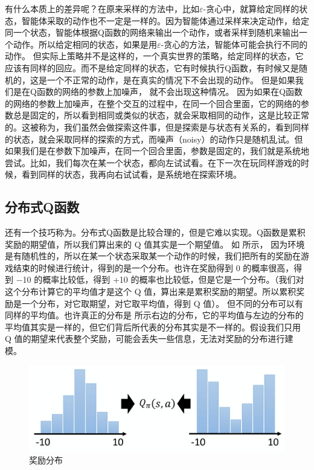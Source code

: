 有什么本质上的差异呢？在原来采样的方法中，比如$\varepsilon$-贪心中，就算给定同样的状态，智能体采取的动作也不一定是一样的。因为智能体通过采样来决定动作，给定同一个状态，智能体根据Q函数的网络来输出一个动作，或者采样到随机来输出一个动作。所以给定相同的状态，如果是用$\varepsilon$-贪心的方法，智能体可能会执行不同的动作。
但实际上策略并不是这样的，一个真实世界的策略，给定同样的状态，它应该有同样的回应。而不是给定同样的状态，它有时候执行Q函数，有时候又是随机的，这是一个不正常的动作，是在真实的情况下不会出现的动作。
但是如果我们是在Q函数的网络的参数上加噪声， 就不会出现这种情况。
因为如果在Q函数的网络的参数上加噪声，在整个交互的过程中，在同一个回合里面，它的网络的参数总是固定的，所以看到相同或类似的状态，就会采取相同的动作，这是比较正常的。这被称为，我们虽然会做探索这件事，但是探索是与状态有关系的，看到同样的状态，就会采取同样的探索的方式，而噪声（noisy）的动作只是随机乱试。但如果我们是在参数下加噪声，在同一个回合里面，参数是固定的，我们就是系统地尝试。比如，我们每次在某一个状态，都向左试试看。在下一次在玩同样游戏的时候，看到同样的状态，我再向右试试看，是系统地在探索环境。

\subsection{分布式Q函数} 
还有一个技巧称为。分布式Q函数是比较合理的，但是它难以实现。Q函数是累积奖励的期望值，所以我们算出来的 Q 值其实是一个期望值。
如 所示，
因为环境是有随机性的，所以在某一个状态采取某一个动作的时候，我们把所有的奖励在游戏结束的时候进行统计，得到的是一个分布。也许在奖励得到 0 的概率很高，得到 $-$10 的概率比较低，得到 +10 的概率也比较低，但是它是一个分布。（我们对这个分布计算它的平均值才是这个 Q 值，算出来是累积奖励的期望。所以累积奖励是一个分布，对它取期望，对它取平均值，得到 Q 值）。
但不同的分布可以有同样的平均值。也许真正的分布是 所示右边的分布，它的平均值与左边的分布的平均值其实是一样的，但它们背后所代表的分布其实是不一样的。假设我们只用 Q 值的期望来代表整个奖励，可能会丢失一些信息，无法对奖励的分布进行建模。

\begin{figure}[htb]
    \centering
    \includegraphics[width=0.5\linewidth]{res/ch7/7.11}
    \caption{奖励分布}
    \label{fig:fig7.11}
\end{figure}


